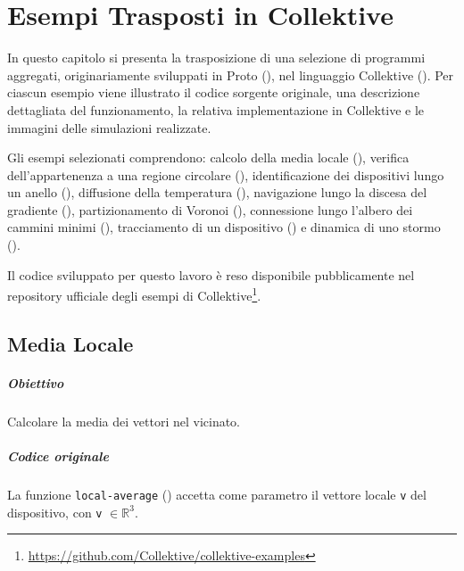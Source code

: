 \chapter{Esempi Trasposti in Collektive}
\label{chap:trasposizione}

In questo capitolo si presenta la trasposizione di una selezione di programmi aggregati, originariamente sviluppati in Proto (), nel linguaggio Collektive ().
%
Per ciascun esempio viene illustrato il codice sorgente originale, una descrizione dettagliata del funzionamento, la relativa implementazione in Collektive e le immagini delle simulazioni realizzate.

Gli esempi selezionati comprendono: calcolo della media locale (), verifica dell’appartenenza a una regione circolare (), identificazione dei dispositivi lungo un anello (), diffusione della temperatura (), navigazione lungo la discesa del gradiente (), partizionamento di Voronoi (), connessione lungo l’albero dei cammini minimi (), tracciamento di un dispositivo () e dinamica di uno stormo ().

Il codice sviluppato per questo lavoro è reso disponibile pubblicamente nel repository ufficiale degli esempi di Collektive\footnote{\url{https://github.com/Collektive/collektive-examples}}.

\newpage
\section{Media Locale}
\label{sec:localaverage}

\paragraph{Obiettivo} Calcolare la media dei vettori nel vicinato.

\paragraph{Codice originale} La funzione \texttt{local-average} () accetta come parametro il vettore locale \texttt{v} del dispositivo, con \texttt{v} \(\in \mathbb{R}^3\).

